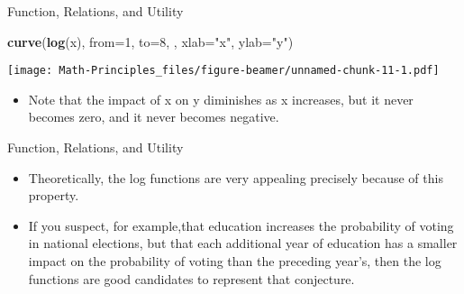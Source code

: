 \documentclass[
  ignorenonframetext,
]{beamer}
\newenvironment{Shaded}{\begin{snugshade}}{\end{snugshade}}
\newcommand{\DataTypeTok}[1]{\textcolor[rgb]{0.13,0.29,0.53}{#1}}
\newcommand{\DecValTok}[1]{\textcolor[rgb]{0.00,0.00,0.81}{#1}}
\newcommand{\KeywordTok}[1]{\textcolor[rgb]{0.13,0.29,0.53}{\textbf{#1}}}
\newcommand{\NormalTok}[1]{#1}
\newcommand{\StringTok}[1]{\textcolor[rgb]{0.31,0.60,0.02}{#1}}
\providecommand{\tightlist}{%
  \setlength{\itemsep}{0pt}\setlength{\parskip}{0pt}}
\begin{document}
\begin{frame}[fragile]{Function, Relations, and Utility}
\protect\hypertarget{function-relations-and-utility-24}{}

\begin{Shaded}
\begin{Highlighting}[]
\KeywordTok{curve}\NormalTok{(}\KeywordTok{log}\NormalTok{(x), }\DataTypeTok{from=}\DecValTok{1}\NormalTok{, }\DataTypeTok{to=}\DecValTok{8}\NormalTok{, , }\DataTypeTok{xlab=}\StringTok{"x"}\NormalTok{, }\DataTypeTok{ylab=}\StringTok{"y"}\NormalTok{)}
\end{Highlighting}
\end{Shaded}

\texttt{[image: Math-Principles\_files/figure-beamer/unnamed-chunk-11-1.pdf]}

\begin{itemize}
\tightlist
\item
  Note that the impact of x on y diminishes as x increases, but it never
  becomes zero, and it never becomes negative.
\end{itemize}

\end{frame}

\begin{frame}{Function, Relations, and Utility}
\protect\hypertarget{function-relations-and-utility-25}{}

\begin{itemize}
\item
  Theoretically, the log functions are very appealing precisely because
  of this property.
\item
  If you suspect, for example,that education increases the probability
  of voting in national elections, but that each additional year of
  education has a smaller impact on the probability of voting than the
  preceding year's, then the log functions are good candidates to
  represent that conjecture.
\end{itemize}

\end{frame}
\end{document}
